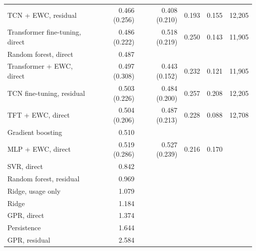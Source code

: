 \begin{table}[t]
\begin{tabular}{lrrrrr}
    TCN + EWC, residual & 0.466 (0.256) & 0.408 (0.210) & 0.193 & 0.155 & 12,205 \\
    Transformer fine-tuning, direct & 0.486 (0.222) & 0.518 (0.219) & 0.250 & 0.143 & 11,905 \\
    Random forest, direct & 0.487 &  &  &  &  \\
    Transformer + EWC, direct & 0.497 (0.308) & 0.443 (0.152) & 0.232 & 0.121 & 11,905 \\
    TCN fine-tuning, residual & 0.503 (0.226) & 0.484 (0.200) & 0.257 & 0.208 & 12,205 \\
    TFT + EWC, direct & 0.504 (0.206) & 0.487 (0.213) & 0.228 & 0.088 & 12,708 \\
    Gradient boosting & 0.510 &  &  &  &  \\
    MLP + EWC, direct & 0.519 (0.286) & 0.527 (0.239) & 0.216 & 0.170 &  \\
    SVR, direct & 0.842 &  &  &  &  \\
    Random forest, residual & 0.969 &  &  &  &  \\
    Ridge, usage only & 1.079 &  &  &  &  \\
    Ridge & 1.184 &  &  &  &  \\
    GPR, direct & 1.374 &  &  &  &  \\
    Persistence & 1.644 &  &  &  &  \\
    GPR, residual & 2.584 &  &  &  &  \\
    \bottomrule
  \end{tabular}
\end{table}
